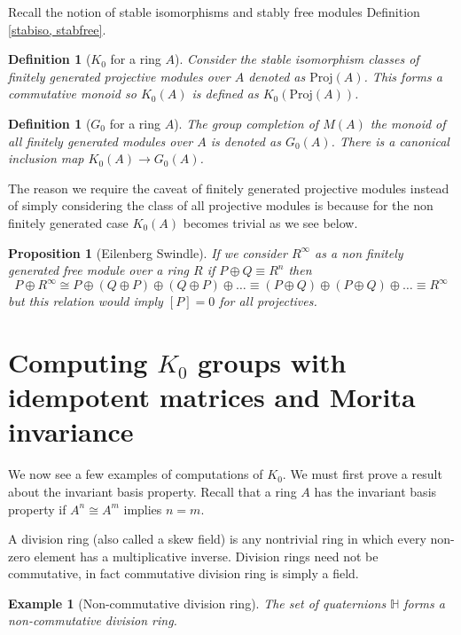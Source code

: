 \documentclass[12pt]{report}
\numberwithin{equation}{section}
\newcounter{dummy} \numberwithin{dummy}{section}
\newtheorem{definition}[dummy]{Definition}
\newtheorem{proposition}[dummy]{Proposition}
\newtheorem{example}[dummy]{Example}
\begin{document}
	Recall the notion of stable isomorphisms and stably free modules Definition \ref{stabiso, stabfree}.
	
	\begin{definition}[$K_0$ for a ring $A$]
		Consider the stable isomorphism classes of finitely generated projective modules over $A$ denoted as $\mathrm{Proj}(A)$. This forms a commutative monoid so $K_0(A)$ is defined as $K_0(\mathrm{Proj}(A))$.
	\end{definition}
	\begin{definition}[$G_0$ for a ring $A$]
	The group completion of $M(A) $ the monoid of all finitely generated modules over $A$ is denoted as $G_0(A) $. 	There is a canonical inclusion map $K_0(A) \to G_0(A)$.
	\end{definition}


The reason we require the caveat of finitely generated projective modules instead of simply considering the class of all projective modules is because for the non finitely generated case $K_0(A)$ becomes trivial as we see below.
	\begin{proposition}[Eilenberg Swindle] If we consider $R^\infty$ as a non finitely generated free module over a ring $R$ if $P \oplus Q \equiv R^n$ then \[ P \oplus R^\infty \cong P \oplus (Q \oplus P) \oplus (Q \oplus P) \oplus \dots \equiv (P \oplus Q) \oplus (P \oplus Q) \oplus \dots \equiv R^\infty \] but this relation would imply $[P]=0 $ for all projectives. 
	\end{proposition}
%	
%	

	\section{Computing $K_0$ groups with idempotent matrices and Morita invariance}\label{k0withidempotent}
	We now see a few examples of computations of $K_0$. We must first prove a result about the invariant basis property. Recall that a ring $A$ has the invariant basis property if $A^n \cong A^m $ implies $n = m$. 
	
	A division ring (also called a skew field) is any nontrivial ring in which every non-zero element has a multiplicative inverse. Division rings need not be commutative, in fact commutative division ring is simply a field.
	\begin{example}[Non-commutative division ring]
		The set of quaternions $\mathbb{H}$ forms a non-commutative division ring.
	\end{example}
	
\end{document}
